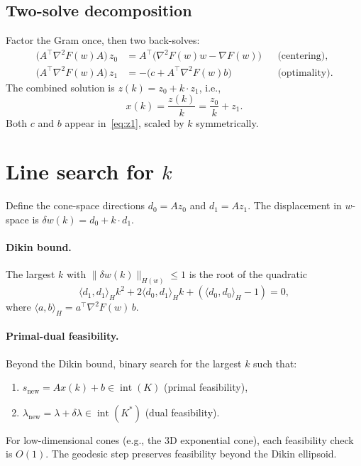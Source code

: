 \documentclass[11pt]{article}
\newcommand{\ip}[2]{\langle #1, #2 \rangle}
\newcommand{\norm}[1]{\|#1\|}
\begin{document}
\subsection{Two-solve decomposition}

Factor the Gram once, then two back-solves:
\begin{align}
  \bigl(A^\top \nabla^2 F(w) A\bigr) \, z_0 &= A^\top\bigl(\nabla^2 F(w) w - \nabla F(w)\bigr)
    && \text{(centering)}, \label{eq:z0} \\
  \bigl(A^\top \nabla^2 F(w) A\bigr) \, z_1 &= -\bigl(c + A^\top \nabla^2 F(w) b\bigr)
    && \text{(optimality)}. \label{eq:z1}
\end{align}
The combined solution is $z(k) = z_0 + k \cdot z_1$, i.e.,
\[
  x(k) = \frac{z(k)}{k} = \frac{z_0}{k} + z_1.
\]
Both $c$ and $b$ appear in~\eqref{eq:z1}, scaled by $k$ symmetrically.

\section{Line search for $k$}

Define the cone-space directions $d_0 = A z_0$ and $d_1 = A z_1$.  The
displacement in $w$-space is $\delta w(k) = d_0 + k \cdot d_1$.

\paragraph{Dikin bound.}
The largest $k$ with $\norm{\delta w(k)}_{H(w)} \leq 1$ is the root of the
quadratic
\[
  \ip{d_1}{d_1}_H k^2 + 2\ip{d_0}{d_1}_H k + (\ip{d_0}{d_0}_H - 1) = 0,
\]
where $\ip{a}{b}_H = a^\top \nabla^2 F(w) \, b$.

\paragraph{Primal-dual feasibility.}
Beyond the Dikin bound, binary search for the largest $k$ such that:
\begin{enumerate}
  \item $s_{\text{new}} = Ax(k) + b \in \operatorname{int}(K)$ \quad (primal feasibility),
  \item $\lambda_{\text{new}} = \lambda + \delta\lambda \in \operatorname{int}(K^*)$ \quad (dual feasibility).
\end{enumerate}
For low-dimensional cones (e.g., the 3D exponential cone), each feasibility
check is $O(1)$.  The geodesic step preserves feasibility beyond the Dikin
ellipsoid.
\end{document}
